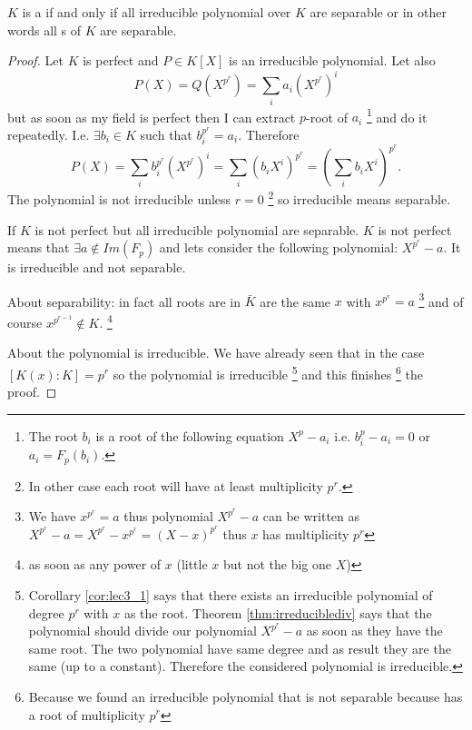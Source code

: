 \begin{theorem}
  $K$ is a  if and only if all irreducible
  polynomial over $K$ 
  are separable or in other words all
  s of $K$ are separable. 
  \begin{proof}
    Let $K$ is perfect and $P \in K\left[X\right]$ is an irreducible
    polynomial. Let also
    \[
    P\left(X\right) = Q\left(X^{p^r}\right) =
    \sum_i a_i \left(X^{p^r}\right)^i
    \]
    but as soon as my field is perfect then I can extract $p$-root of
    $a_i$
    \footnote {
      The root $b_i$ is a root of the following equation $X^p - a_i$
      i.e. $b_i^p -a_i = 0$ or $a_i = F_p\left(b_i\right)$.      
    }
    and do it repeatedly. I.e. $\exists b_i \in K$ such that
    $b_i^{p^r} = a_i$. Therefore
    \[
    P\left(X\right) =
    \sum_i b_i^{p^r} \left(X^{p^r}\right)^i =
    \sum_i \left(b_i X^i\right)^{p^r} =
    \left( \sum_i b_i X^i\right)^{p^r}.
    \]
    The polynomial is not irreducible unless $r=0$
    \footnote{
      In other case each root will have at least multiplicity $p^r$.
    } so irreducible means separable.

    If $K$ is not perfect but all irreducible polynomial are
    separable. $K$ is not perfect means that $\exists a \notin
    Im\left(F_p\right)$ and lets consider the following polynomial:
    $X^{p^r} - a$. It is irreducible and not separable.

    About separability:
    in fact all roots are in $\bar{K}$ are
    the same $x$ with $x^{p^r} = a$
    \footnote{
      We have $x^{p^r} = a$ thus polynomial
      $X^{p^r} - a$ can be written as
      $X^{p^r} - a = X^{p^r} - x^{p^r} = \left(X - x\right)^{p^r}$
      thus $x$ has multiplicity $p^r$
    }
    and of course
    $x^{p^{r-1}} \notin K$.
    \footnote{
      as soon as any power of $x$ (little $x$ but not the big one $X$)
    }

    About the polynomial is irreducible.
    We have already seen that in the case
    $\left[K\left(x\right): K\right] = p^r$ so the polynomial is
    irreducible
    \footnote {
      Corollary \ref{cor:lec3_1} says that there exists an irreducible
      polynomial of degree $p^r$ with $x$ as the root. Theorem
      \ref{thm:irreduciblediv} says that the polynomial should divide
      our polynomial $X^{p^r} -a$ as soon as they have the same
      root. The two polynomial have same degree and as result they are
      the same (up to a constant). Therefore the considered polynomial
      is irreducible.
    }
    and this finishes 
    \footnote{
      Because we found an irreducible polynomial that is not
      separable because has a root of multiplicity $p^r$
    }
    the proof.
  \end{proof}
  \label{thm:lec3_4}
\end{theorem}
